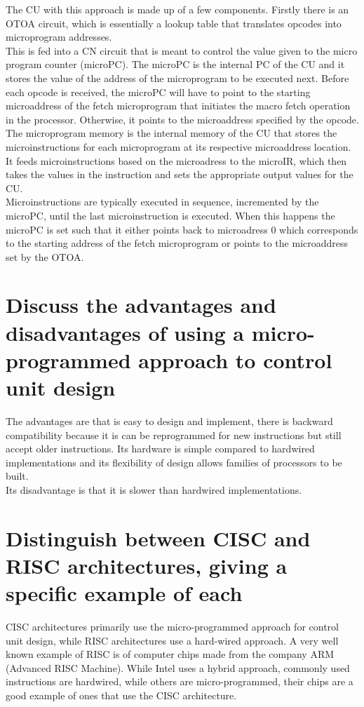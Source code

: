 \documentclass{article}
\begin{document}
The CU with this approach is made up of a few components. Firstly there is an
OTOA circuit, which is essentially a lookup table that translates opcodes into
microprogram addresses. \\
This is fed into a CN circuit that is meant to control the value given to the
micro program counter (microPC). The microPC is the internal PC of the CU and it
stores the value of the address of the microprogram to be executed next. Before
each opcode is received, the microPC will have to point to the starting
microaddress of the fetch microprogram that initiates the macro fetch operation
in the processor. Otherwise, it points to the microaddress specified by the
opcode. \\
The microprogram memory is the internal memory of the CU that stores the
microinstructions for each microprogram at its respective microaddress location.
\\
It feeds microinstructions based on the microadress to the microIR, which then
takes the values in the instruction and sets the appropriate output values for
the CU. \\
Microinstructions are typically executed in sequence, incremented by the
microPC, until the last microinstruction is executed. When this happens the
microPC is set such that it either points back to microadress 0 which
corresponds to the starting address of the fetch microprogram or points to the
microaddress set by the OTOA.

\section{Discuss the advantages and disadvantages of using a micro-programmed approach to control unit design}

The advantages are that is easy to design and implement, there is backward
compatibility because it is can be reprogrammed for new instructions but still
accept older instructions. Its hardware is simple compared to hardwired
implementations and its flexibility of design allows families of processors to
be built. \\
Its disadvantage is that it is slower than hardwired implementations.

\section{Distinguish between CISC and RISC architectures, giving a specific example of each}

CISC architectures primarily use the micro-programmed approach for control unit
design, while RISC architectures use a hard-wired approach. A very well known
example of RISC is of computer chips made from the company ARM (Advanced RISC
Machine). While Intel uses a hybrid approach, commonly used instructions are
hardwired, while others are micro-programmed, their chips are a good example of
ones that use the CISC architecture.
\end{document}
